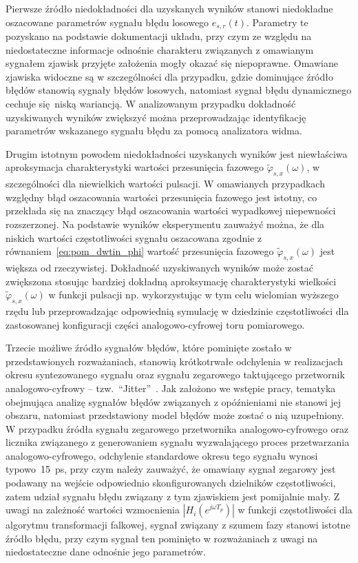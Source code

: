Pierwsze źródło niedokładności dla uzyskanych wyników stanowi niedokładne oszacowane parametrów sygnału błędu losowego $e_{s,r}(t)$. Parametry te pozyskano na podstawie dokumentacji układu, przy czym ze względu na niedostateczne informacje odnośnie charakteru związanych z omawianym sygnałem zjawisk przyjęte założenia mogły okazać się niepoprawne. Omawiane zjawiska widoczne są w szczególności dla przypadku, gdzie dominujące źródło błędów stanowią sygnały błędów losowych, natomiast sygnał błędu dynamicznego cechuje się niską wariancją. W analizowanym przypadku dokładność uzyskiwanych wyników zwiększyć można przeprowadzając identyfikację parametrów wskazanego sygnału błędu za pomocą analizatora widma.

Drugim istotnym powodem niedokładności uzyskanych wyników jest niewłaściwa aproksymacja charakterystyki wartości przesunięcia fazowego $\tilde{\varphi}_{s,x}(\omega)$, w szczególności dla niewielkich wartości pulsacji. W omawianych przypadkach względny błąd oszacowania wartości przesunięcia fazowego jest istotny, co przekłada się na znaczący błąd oszacowania wartości wypadkowej niepewności rozszerzonej. Na podstawie wyników eksperymentu zauważyć można, że dla niskich wartości częstotliwości sygnału oszacowana zgodnie z równaniem~\eqref{eq:pom_dwtin_phi} wartość przesunięcia fazowego $\tilde{\varphi}_{s,x}(\omega)$ jest większa od rzeczywistej. Dokładność uzyskiwanych wyników może zostać zwiększona stosując bardziej dokładną aproksymację charakterystyki wielkości $\tilde{\varphi}_{s,x}(\omega)$ w funkcji pulsacji np. wykorzystując w tym celu wielomian wyższego rzędu lub przeprowadzając odpowiednią symulację w dziedzinie częstotliwości dla zastosowanej konfiguracji części analogowo-cyfrowej toru pomiarowego.

Trzecie możliwe źródło sygnałów błędów, które pominięte zostało w przedstawionych rozważaniach, stanowią krótkotrwałe odchylenia w realizacjach okresu syntezowanego sygnału oraz sygnału zegarowego taktującego przetwornik analogowo-cyfrowy -- tzw.~\enquote{Jitter}~\cite{renesans_jitter}. Jak założono we wstępie pracy, tematyka obejmująca analizę sygnałów błędów związanych z opóźnieniami nie stanowi jej obszaru, natomiast przedstawiony model błędów może zostać o nią uzupełniony. W przypadku źródła sygnału zegarowego przetwornika analogowo-cyfrowego oraz licznika związanego z generowaniem sygnału wyzwalającego proces przetwarzania analogowo-cyfrowego, odchylenie standardowe okresu tego sygnału wynosi typowo~\qty{15}{ps}, przy czym należy zauważyć, że omawiany sygnał zegarowy jest podawany na wejście odpowiednio skonfigurowanych dzielników częstotliwości, zatem udział sygnału błędu związany z tym zjawiskiem jest pomijalnie mały. Z uwagi na zależność wartości wzmocnienia $|H_{i}(e^{j \omega T_{p}})|$ w funkcji częstotliwości dla algorytmu transformacji falkowej, sygnał związany z szumem fazy stanowi istotne źródło błędu, przy czym sygnał ten pominięto w rozważaniach z uwagi na niedostateczne dane odnośnie jego parametrów.

